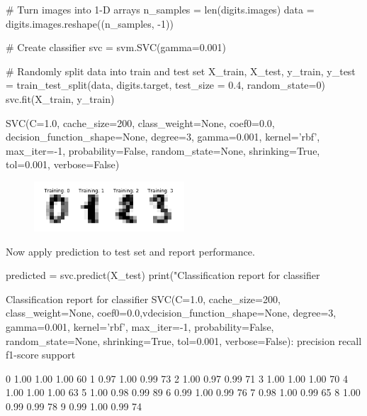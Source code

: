 \begin{example}
\begin{ipythonnb}
# Turn images into 1-D arrays
n_samples = len(digits.images)
data = digits.images.reshape((n_samples, -1))

# Create classifier
svc = svm.SVC(gamma=0.001)

# Randomly split data into train and test set
X_train, X_test, y_train, y_test = train_test_split(data, 
 digits.target, test_size = 0.4, random_state=0)
svc.fit(X_train, y_train)
\end{ipythonnb}

\begin{ipythonnbout}[2]
SVC(C=1.0, cache_size=200, class_weight=None, coef0=0.0,
  decision_function_shape=None, degree=3, gamma=0.001, 
  kernel='rbf', max_iter=-1, probability=False, random_state=None,
  shrinking=True, tol=0.001, verbose=False)
\end{ipythonnbout}

\begin{figure}[h!]
\centering
\includegraphics[width=0.5\textwidth]{images/train-digits.png}
\end{figure}

Now apply prediction to test set and report performance.

\begin{ipythonnb}[3]
predicted = svc.predict(X_test)
print("Classification report for classifier %
\end{ipythonnb}

\begin{ipythonnbout}[3]
Classification report for classifier SVC(C=1.0, cache_size=200,
 class_weight=None, coef0=0.0,vdecision_function_shape=None,
 degree=3, gamma=0.001, kernel='rbf', max_iter=-1, probability=False, 
 random_state=None, shrinking=True, tol=0.001, verbose=False):
             precision    recall  f1-score   support

          0       1.00      1.00      1.00        60
          1       0.97      1.00      0.99        73
          2       1.00      0.97      0.99        71
          3       1.00      1.00      1.00        70
          4       1.00      1.00      1.00        63
          5       1.00      0.98      0.99        89
          6       0.99      1.00      0.99        76
          7       0.98      1.00      0.99        65
          8       1.00      0.99      0.99        78
          9       0.99      1.00      0.99        74


\end{ipythonnbout}
\end{example}
